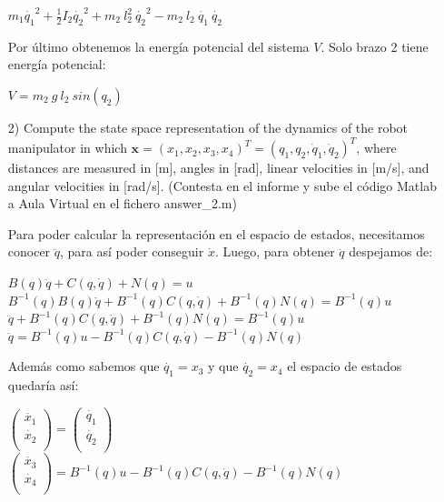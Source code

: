 \documentclass[a4paper]{article}
\begin{document}
\begin{itemize}
\begin{center}
	$m_{1}\dot{q_{1}}^2 + \frac{1}{2}I_{2}\dot{q_{2}}^2 + m_{2}\ l_{2}^2\ \dot{q_{2}}^2 - m_{2}\ l_{2}\ \dot{q_{1}}\ \dot{q_{2}}
	$
\end{center}

Por último obtenemos la energía potencial del sistema $V$. Solo brazo 2 tiene energía potencial:
\begin{center}
	$V = m_{2}\ g\ l_{2}\ sin(q_{2})$
\end{center}

\bigskip


\item[2)] 
 {\color{gray} Compute the state space representation of the dynamics of the robot manipulator in which $\mathbf{x} = (x_1,x_2,x_3,x_4)^T= (q_1, q_2, \dot{q}_1, \dot{q}_2)^T$, where distances are measured in [m], angles in [rad], linear velocities in [m/s], and angular velocities in [rad/s]. (Contesta en el informe y sube el c\'odigo Matlab a Aula Virtual en el fichero answer\_2.m)}
 
 \bigskip

Para poder calcular la representación en el espacio de estados, necesitamos conocer $\ddot{q}$, para así poder conseguir $\dot{x}$. Luego, para obtener $\ddot{q}$ despejamos de:

\begin{center}
	$B(q)\ddot{q} + C(q,\dot{q}) + N(q) = u$\\
	$B^{-1}(q)B(q)\ddot{q} + B^{-1}(q)C(q,\dot{q}) + B^{-1}(q)N(q) = B^{-1}(q)u$
	$\ddot{q} + B^{-1}(q)C(q,\dot{q}) + B^{-1}(q)N(q) = B^{-1}(q)u$
	$\ddot{q} = B^{-1}(q)u - B^{-1}(q)C(q,\dot{q}) - B^{-1}(q)N(q)$
\end{center}

Además como sabemos que $\dot{q_{1}} = x_{3}$ y que $\dot{q_{2}} = x_{4}$ el espacio de estados quedaría así:

\begin{center}
	$\begin{pmatrix}
		\dot{x_{1}}\\       
		\dot{x_{2}}\\       
	\end{pmatrix} = \begin{pmatrix}
		\dot{q_{1}}\\       
		\dot{q_{2}}\\      
	\end{pmatrix}$	\\
	$\begin{pmatrix}
		\dot{x_{3}}\\       
		\dot{x_{4}}\\       
	\end{pmatrix} = B^{-1}(q)u - B^{-1}(q)C(q,\dot{q}) - B^{-1}(q)N(q)$
\end{center}


\end{itemize}
\end{document}
